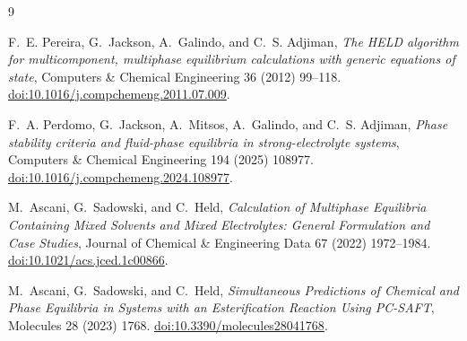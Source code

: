 \documentclass[11pt]{article}
\begin{document}
\begin{thebibliography}{9}

F.~E. Pereira, G.~Jackson, A.~Galindo, and C.~S. Adjiman,
\emph{The HELD algorithm for multicomponent, multiphase equilibrium
calculations with generic equations of state},
Computers \& Chemical Engineering 36 (2012) 99--118.
\href{https://doi.org/10.1016/j.compchemeng.2011.07.009}
{doi:10.1016/j.compchemeng.2011.07.009}.

F.~A. Perdomo, G.~Jackson, A.~Mitsos, A.~Galindo, and C.~S. Adjiman,
\emph{Phase stability criteria and fluid-phase equilibria in
strong-electrolyte systems},
Computers \& Chemical Engineering 194 (2025) 108977.
\href{https://doi.org/10.1016/j.compchemeng.2024.108977}
{doi:10.1016/j.compchemeng.2024.108977}.

M.~Ascani, G.~Sadowski, and C.~Held,
\emph{Calculation of Multiphase Equilibria Containing Mixed Solvents and
Mixed Electrolytes: General Formulation and Case Studies},
Journal of Chemical \& Engineering Data 67 (2022) 1972--1984.
\href{https://doi.org/10.1021/acs.jced.1c00866}
{doi:10.1021/acs.jced.1c00866}.

M.~Ascani, G.~Sadowski, and C.~Held,
\emph{Simultaneous Predictions of Chemical and Phase Equilibria in Systems
with an Esterification Reaction Using PC-SAFT},
Molecules 28 (2023) 1768.
\href{https://doi.org/10.3390/molecules28041768}
{doi:10.3390/molecules28041768}.

\end{thebibliography}
\end{document}
